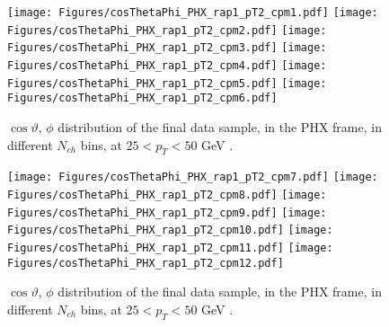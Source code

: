 \documentclass[12pt]{article}
\begin{document}
\begin{figure}[htbp]
\centering
\texttt{[image: Figures/cosThetaPhi\_PHX\_rap1\_pT2\_cpm1.pdf]}
\texttt{[image: Figures/cosThetaPhi\_PHX\_rap1\_pT2\_cpm2.pdf]}
\texttt{[image: Figures/cosThetaPhi\_PHX\_rap1\_pT2\_cpm3.pdf]}
\texttt{[image: Figures/cosThetaPhi\_PHX\_rap1\_pT2\_cpm4.pdf]}
\texttt{[image: Figures/cosThetaPhi\_PHX\_rap1\_pT2\_cpm5.pdf]}
\texttt{[image: Figures/cosThetaPhi\_PHX\_rap1\_pT2\_cpm6.pdf]}
\caption{$\cos\vartheta,\,\phi$ distribution of the final data sample, 
	in the PHX frame, in different $N_{ch}$ bins, at $25 < p_{T} < 50$ GeV .}
\end{figure}
\clearpage

\begin{figure}[htbp]
\centering
\texttt{[image: Figures/cosThetaPhi\_PHX\_rap1\_pT2\_cpm7.pdf]}
\texttt{[image: Figures/cosThetaPhi\_PHX\_rap1\_pT2\_cpm8.pdf]}
\texttt{[image: Figures/cosThetaPhi\_PHX\_rap1\_pT2\_cpm9.pdf]}
\texttt{[image: Figures/cosThetaPhi\_PHX\_rap1\_pT2\_cpm10.pdf]}
\texttt{[image: Figures/cosThetaPhi\_PHX\_rap1\_pT2\_cpm11.pdf]}
\texttt{[image: Figures/cosThetaPhi\_PHX\_rap1\_pT2\_cpm12.pdf]}
\caption{$\cos\vartheta,\,\phi$ distribution of the final data sample, 
	in the PHX frame, in different $N_{ch}$ bins, at $25 < p_{T} < 50$ GeV .}
\end{figure}
\clearpage
\end{document}
